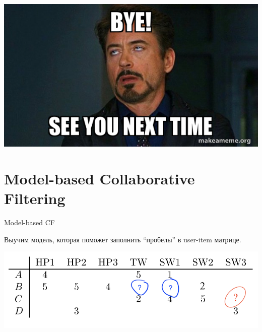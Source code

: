 \documentclass[11pt,aspectratio=169,handout]{beamer}
\begin{document}
\begin{frame}
\begin{center}
\includegraphics[scale=0.8]{images/bye.jpeg}
\end{center}
\end{frame}

\section{Model-based Collaborative Filtering}

\begin{frame}{Model-based CF}

\begin{tcolorbox}[colback=info!5,colframe=info!80,title=Идея]
Выучим модель, которая поможет заполнить ``пробелы'' в user-item матрице.
\end{tcolorbox}

\begin{center}
\includegraphics[scale=0.5]{images/utility-2.png}
\end{center}

\end{frame}
\end{document}
